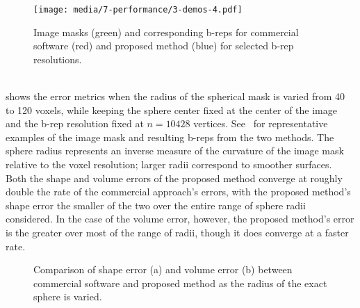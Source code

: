 \begin{figure}[ht!]
	\centering
	\texttt{[image: media/7-performance/3-demos-4.pdf]}
	\caption{Image masks (green) and corresponding b-reps for commercial software (red) and proposed method (blue) for selected b-rep resolutions.}
	\label{fig:demos1}
\end{figure} \\
%
 shows the error metrics when the radius of the spherical mask is varied from 40 to 120 voxels, while keeping the sphere center fixed at the center of the image and the b-rep resolution fixed at $n = 10428$ vertices. See~ for representative examples of the image mask and resulting b-reps from the two methods. The sphere radius represents an inverse measure of the curvature of the image mask relative to the voxel resolution; larger radii correspond to smoother surfaces. Both the shape and volume errors of the proposed method converge at roughly double the rate of the commercial approach's errors, with the proposed method's shape error the smaller of the two over the entire range of sphere radii considered.  In the case of the volume error, however, the proposed method's error is the greater over most of the range of radii, though it does converge at a faster rate. \\
\begin{figure}[b!]
	\centering
	\caption{Comparison of shape error (a) and volume error (b) between commercial software and proposed method as the radius of the exact sphere is varied.}
	\label{fig:graph2}
\end{figure}
